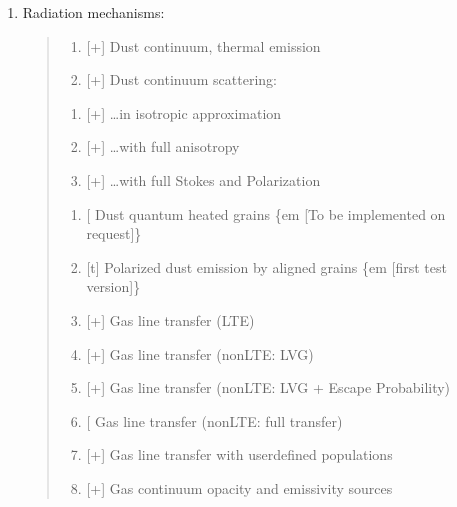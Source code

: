 \documentclass[letterpaper,10pt,english]{sphinxmanual}
\begin{document}
\begin{enumerate}
%
\item {} 
Radiation mechanisms:
\begin{quote}
\begin{enumerate}
%
\item {} 
{[}+{]} Dust continuum, thermal emission

\item {} 
{[}+{]} Dust continuum scattering:

\end{enumerate}
\begin{enumerate}
%
\item {} 
{[}+{]} …in isotropic approximation

\item {} 
{[}+{]} …with full anisotropy

\item {} 
{[}+{]} …with full Stokes and Polarization

\end{enumerate}
\begin{enumerate}
%
\item {} 
{[}\sphinxhyphen{}{]} Dust quantum heated grains \{em {[}To be implemented on request{]}\}

\item {} 
{[}t{]} Polarized dust emission by aligned grains \{em {[}first test version{]}\}

\item {} 
{[}+{]} Gas line transfer (LTE)

\item {} 
{[}+{]} Gas line transfer (non\sphinxhyphen{}LTE: LVG)

\item {} 
{[}+{]} Gas line transfer (non\sphinxhyphen{}LTE: LVG + Escape Probability)

\item {} 
{[}\sphinxhyphen{}{]} Gas line transfer (non\sphinxhyphen{}LTE: full transfer)

\item {} 
{[}+{]} Gas line transfer with user\sphinxhyphen{}defined populations

\item {} 
{[}+{]} Gas continuum opacity and emissivity sources

\end{enumerate}
\end{quote}


\end{enumerate}
\end{document}
